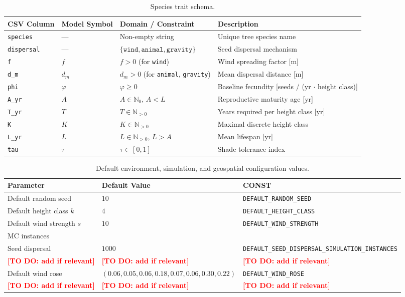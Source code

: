 \documentclass[a4paper,11pt]{scrartcl}
\newcommand{\N}{\mathbb{N}}
\newcommand{\p}{\varphi}
\newcommand{\ta}{\tau}
\DeclareRobustCommand{\todo}[1]{\textcolor{red}{\textbf{[TO DO: #1]}}}
\begin{document}
\begin{table}[!ht]
\centering
\small
\begin{tabularx}{\textwidth}{l l l >{\raggedright\arraybackslash}X}
\toprule
\textbf{CSV Column} & \textbf{Model Symbol} & \textbf{Domain / Constraint} & \textbf{Description} \\
\midrule
\texttt{species} & --- & Non-empty string & Unique tree species name \\
\texttt{dispersal} & --- & $\{\texttt{wind}, \texttt{animal}, \texttt{gravity}\}$ & Seed dispersal mechanism \\
\texttt{f} & $f$ & $f > 0$ (for \texttt{wind}) & Wind spreading factor [m] \\
\texttt{d\_m} & $d_m$ & $d_m > 0$ (for \texttt{animal}, \texttt{gravity}) & Mean dispersal distance [m] \\
\texttt{phi} & $\p$ & $\p \ge 0$ & Baseline fecundity [seeds / (yr $\cdot$ height class)] \\
\texttt{A\_yr} & $A$ & $A \in \N_0$, $A < L$ & Reproductive maturity age [yr] \\
\texttt{T\_yr} & $T$ & $T \in \N_{>0}$ & Years required per height class [yr] \\
\texttt{K} & $K$ & $K \in \N_{>0}$ & Maximal discrete height class \\
\texttt{L\_yr} & $L$ & $L \in \N_{>0}$, $L > A$ & Mean lifespan [yr] \\
\texttt{tau} & $\ta$ & $\ta \in [0, 1]$ & Shade tolerance index \\
\bottomrule
\end{tabularx}
\caption{Species trait schema.}
\label{tab:species_schema}
\end{table}

\begin{table}[!ht]
\centering
\footnotesize
\setlength{\tabcolsep}{5pt}
\begin{tabular}{l l l}
\toprule
\textbf{Parameter} & \textbf{Default Value} & \textbf{CONST} \\
\midrule
Default random seed & $10$ & \texttt{DEFAULT\_RANDOM\_SEED} \\
Default height class $k$ & $4$ & \texttt{DEFAULT\_HEIGHT\_CLASS} \\
Default wind strength $s$ & $10$ & \texttt{DEFAULT\_WIND\_STRENGTH} \\
MC instances & & \\
\hspace{1.2em}Seed dispersal & $1000$ & \texttt{DEFAULT\_SEED\_DISPERSAL\_SIMULATION\_INSTANCES} \\
\hspace{1.2em}\todo{add if relevant} & \todo{add if relevant} & \todo{add if relevant} \\
Default wind rose & $(0.06, 0.05, 0.06, 0.18, 0.07, 0.06, 0.30, 0.22)$ & \texttt{DEFAULT\_WIND\_ROSE} \\
\todo{add if relevant} & \todo{add if relevant} & \todo{add if relevant} \\
\bottomrule
\end{tabular}
\caption{Default environment, simulation, and geospatial configuration values.}
\label{tab:env_defaults}
\end{table}
\end{document}
